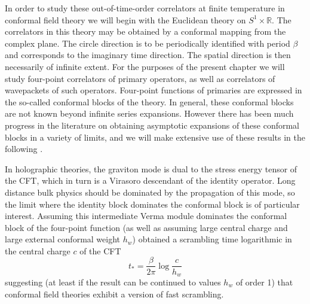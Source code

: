 \documentclass{brownthesis}
\begin{document}
In order to study these out-of-time-order correlators at finite temperature
in conformal field theory we will begin with the Euclidean theory
on $S^{1}\times\mathbb{R}$. The correlators in this theory may be
obtained by a conformal mapping from the complex plane. The circle
direction is to be periodically identified with period $\beta$ and
corresponds to the imaginary time direction. The spatial direction
is then necessarily of infinite extent. For the purposes of the present
chapter we will study four-point correlators of primary operators, as
well as correlators of wavepackets of such operators. Four-point functions
of primaries are expressed in the so-called conformal blocks of the
theory. In general, these conformal blocks are not known beyond infinite
series expansions. However there has been much progress in the literature
on obtaining asymptotic expansions of these conformal blocks in a
variety of limits, and we will make extensive use of these results
in the following \cite{Fitzpatrick:2014vua}.

In holographic theories, the graviton mode is dual to the stress energy
tensor of the CFT, which in turn is a Virasoro descendant of the identity
operator. Long distance bulk physics should be dominated by the propagation
of this mode, so the limit where the identity block dominates the
conformal block is of particular interest. Assuming this intermediate
Verma module dominates the conformal block of the four-point function
\cite{PhysRevLett.115.131603} (as well as assuming large central
charge and large external conformal weight $h_{w}$) obtained a scrambling
time logarithmic in the central charge $c$ of the CFT
\begin{equation}
t_{*}=\frac{\beta}{2\pi}\log\frac{c}{h_{w}}\label{eq:rstime}
\end{equation}
suggesting (at least if the result can be continued to values $h_{w}$
of order 1) that conformal field theories exhibit a version of fast
scrambling.
\end{document}
